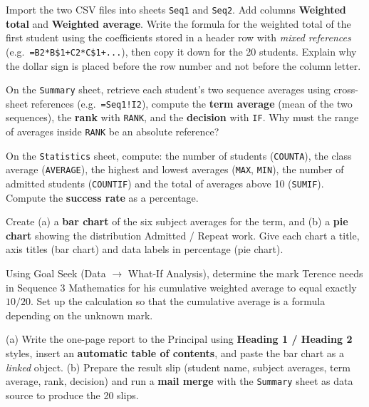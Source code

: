 \documentclass[11pt]{article}
\newcommand{\cle}[1]{{\popxbold\color{popdark}#1}}
\begin{document}
\begin{exercice}
Import the two CSV files into sheets \texttt{Seq1} and \texttt{Seq2}. Add columns \textbf{Weighted total} and \textbf{Weighted average}. Write the formula for the weighted total of the first student using the coefficients stored in a header row with \emph{mixed references} (e.g.\ \texttt{=B2*B\$1+C2*C\$1+...}), then copy it down for the 20 students. Explain why the dollar sign is placed before the row number and not before the column letter.
\end{exercice}

\begin{exercice}
On the \texttt{Summary} sheet, retrieve each student's two sequence averages using \cle{cross-sheet references} (e.g.\ \texttt{=Seq1!I2}), compute the \textbf{term average} (mean of the two sequences), the \textbf{rank} with \texttt{RANK}, and the \textbf{decision} with \texttt{IF}. Why must the range of averages inside \texttt{RANK} be an absolute reference?
\end{exercice}

\begin{exercice}
On the \texttt{Statistics} sheet, compute: the number of students (\texttt{COUNTA}), the class average (\texttt{AVERAGE}), the highest and lowest averages (\texttt{MAX}, \texttt{MIN}), the number of admitted students (\texttt{COUNTIF}) and the total of averages above 10 (\texttt{SUMIF}). Compute the \textbf{success rate} as a percentage.
\end{exercice}

\begin{exercice}
Create (a) a \textbf{bar chart} of the six subject averages for the term, and (b) a \textbf{pie chart} showing the distribution Admitted / Repeat work. Give each chart a title, axis titles (bar chart) and data labels in percentage (pie chart).
\end{exercice}

\begin{exercice}
Using \cle{Goal Seek} (Data $\rightarrow$ What-If Analysis), determine the mark Terence needs in Sequence 3 Mathematics for his cumulative weighted average to equal exactly $10/20$. Set up the calculation so that the cumulative average is a formula depending on the unknown mark.
\end{exercice}

\begin{exercice}
(a) Write the one-page report to the Principal using \textbf{Heading 1 / Heading 2} styles, insert an \textbf{automatic table of contents}, and paste the bar chart as a \emph{linked} object. (b) Prepare the result slip (student name, subject averages, term average, rank, decision) and run a \textbf{mail merge} with the \texttt{Summary} sheet as data source to produce the 20 slips.
\end{exercice}
\end{document}
